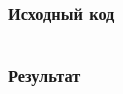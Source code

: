 \subsubsection{Исходный код}
\inputminted[breaklines]{python}{../task_1.py}

\subsubsection{Результат}
\inputminted[breaklines]{js}{../schedule_1.json}